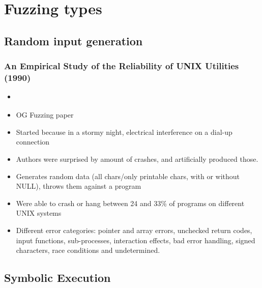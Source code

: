 \documentclass{article}
\begin{document}
\section{Fuzzing types}
\subsection{Random input generation}
\subsubsection{An Empirical Study of the Reliability of UNIX Utilities (1990)}
\begin{itemize}
    \item \cite{UNIX}
    \item OG Fuzzing paper
    \item Started because in a stormy night, electrical interference on a dial-up connection
    \item Authors were surprised by amount of crashes, and artificially produced those.
    \item Generates random data (all chars/only printable chars, with or without NULL), throws them against a program
    \item Were able to crash or hang between 24 and 33\% of programs on different UNIX systems
    \item Different error categories: pointer and array errors, unchecked return codes, input functions, sub-processes, interaction effects, bad error handling, signed characters, race conditions and undetermined.
\end{itemize}

\subsection{Symbolic Execution}
\end{document}
